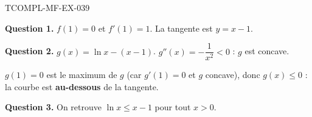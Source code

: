 \begin{corrige}{TCOMPL-MF-EX-039}

\textbf{Question 1.} $f(1)=0$ et $f'(1)=1$. La tangente est $y = x - 1$.


\textbf{Question 2.} $g(x) = \ln x - (x-1)$. $g''(x) = -\dfrac{1}{x^2} < 0$ : $g$ est concave.

$g(1) = 0$ est le maximum de $g$ (car $g'(1) = 0$ et $g$ concave), donc $g(x) \leq 0$ : la courbe est \textbf{au-dessous} de la tangente.

\textbf{Question 3.} On retrouve $\ln x \leq x - 1$ pour tout $x > 0$.

\end{corrige}
